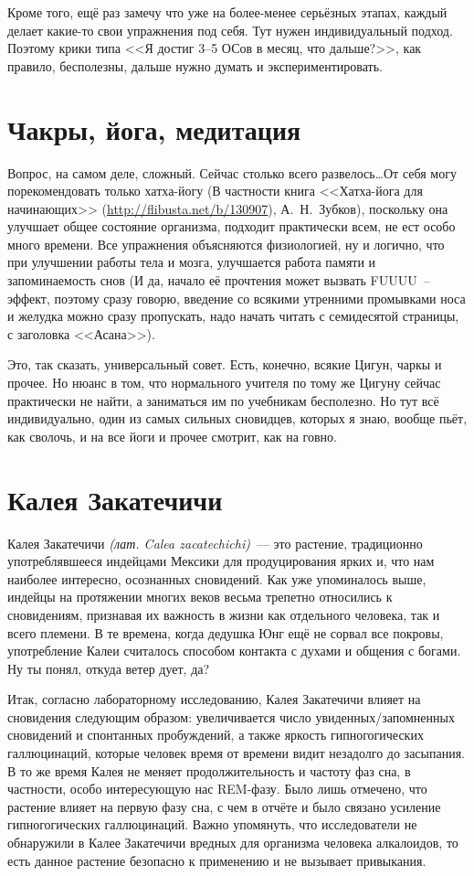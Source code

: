 \documentclass[a4paper,14pt,oneside]{memoir}
\begin{document}
Кроме того, ещё раз замечу что уже на более-менее серьёзных этапах, каждый делает какие-то свои упражнения под себя. Тут нужен индивидуальный подход. Поэтому крики типа <<Я достиг 3--5 ОСов в месяц, что дальше?>>, как правило, бесполезны, дальше нужно думать и экспериментировать.




\section{Чакры, йога, медитация}

Вопрос, на самом деле, сложный. Сейчас столько всего развелось\ldots От себя могу порекомендовать только хатха-йогу (В частности книга <<Хатха-йога для начинающих>> (\url{http://flibusta.net/b/130907}), А.\, Н.~Зубков), поскольку она улучшает общее состояние организма, подходит практически всем, не ест особо много времени. Все упражнения объясняются физиологией, ну и логично, что при улучшении работы тела и мозга, улучшается работа памяти и запоминаемость снов (И да, начало её прочтения может вызвать FUUUU~–эффект, поэтому сразу говорю, введение со всякими утренними промывками носа и желудка можно сразу пропускать, надо начать читать с семидесятой страницы, с заголовка <<Асана>>).

Это, так сказать, универсальный совет. Есть, конечно, всякие Цигун, чаркы и прочее. Но нюанс в том, что нормального учителя по тому же Цигуну сейчас практически не найти, а заниматься им по учебникам бесполезно. Но тут всё индивидуально, один из самых сильных сновидцев, которых я знаю, вообще пьёт, как сволочь, и на все йоги и прочее смотрит, как на говно.




\section{Калея Закатечичи}

Калея Закатечичи \textit{(лат. Calea zacatechichi)}~--- это растение, традиционно употреблявшееся индейцами Мексики для  продуцирования ярких и, что нам наиболее интересно, осознанных сновидений. Как уже упоминалось выше, индейцы на протяжении многих веков весьма трепетно относились к сновидениям, признавая их важность в жизни как отдельного человека, так и всего племени. В те времена, когда дедушка Юнг ещё не сорвал все покровы, употребление Калеи считалось способом контакта с духами и общения с богами. Ну ты понял, откуда ветер дует, да? 

Итак, согласно лабораторному исследованию, Калея Закатечичи влияет на сновидения следующим образом: увеличивается число увиденных/запомненных сновидений и спонтанных пробуждений, а также яркость гипногогических галлюцинаций, которые человек время от времени видит незадолго до засыпания. В то же время Калея не меняет продолжительность и частоту фаз сна, в частности, особо интересующую нас REM-фазу. Было лишь отмечено, что растение влияет на первую фазу сна, с чем в отчёте и было связано усиление гипногогических галлюцинаций. Важно упомянуть, что исследователи не обнаружили в Калее Закатечичи вредных для организма человека алкалоидов, то есть данное растение безопасно к применению и не вызывает привыкания. 
\end{document}
